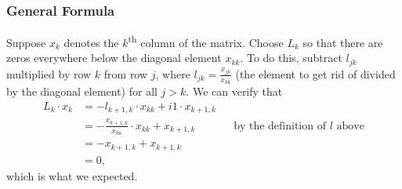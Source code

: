 \documentclass[12pt,letterpaper,DIV=11]{scrartcl}
\theoremstyle{plain}
\theoremstyle{definition}
\theoremstyle{remark}
\begin{document}
\subsubsection{General Formula}
Suppose $x_k$ denotes the $k$\textsuperscript{th} column of the matrix.
Choose $L_k$ so that there are zeros everywhere below the diagonal element $x_{k k}$.
To do this, subtract $l_{jk}$ multiplied by row $k$ from row $j$, where $l_{jk} = \frac{x_{jk}}{x_{kk}}$ (the element to get rid of divided by the diagonal element) for all $j > k$.
We can verify that \begin{align*}
  L_k \cdot x_{k} &= -l_{k + 1, k} \cdot x_{kk} + i1 \cdot x_{k + 1, k} \\
                  &= - \frac{x_{k + 1, k}}{x_{kk}} \cdot x_{kk} + x_{k + 1,k} && \text{by the definition of $l$ above} \\
                  &= - x_{k + 1, k} + x_{k + 1,k} \\
                  &= 0,
\end{align*} which is what we expected.
\end{document}
